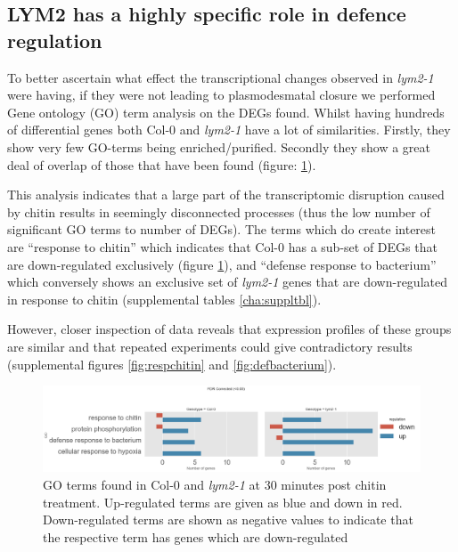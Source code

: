 \documentclass[../main.tex]{subfiles}
\begin{document}
\subsection{LYM2 has a highly specific role in defence regulation}

To better ascertain what effect the transcriptional changes observed in
\textit{lym2-1} were having, if they were not leading to plasmodesmatal closure we
performed Gene ontology (GO) term analysis on the DEGs found. Whilst having
hundreds of differential genes both Col-0 and \textit{lym2-1} have a lot of
similarities. Firstly, they show very few GO-terms being enriched/purified.
Secondly they show a great deal of overlap of those that have been found
(figure: \ref{fig:05hrGO}).

This analysis indicates that a large part of the transcriptomic disruption
caused by chitin results in seemingly disconnected processes (thus the low
number of significant GO terms to number of DEGs). The terms which do create interest are
``response to chitin'' which indicates that Col-0 has a sub-set of DEGs that are
down-regulated exclusively (figure \ref{fig:05hrGO}), and ``defense response to bacterium''
which conversely shows an exclusive set of \textit{lym2-1} genes that are
down-regulated in response to chitin (supplemental
tables \ref{cha:suppltbl}).

However, closer inspection of data reveals that expression profiles of these groups
are similar and that repeated experiments could give contradictory results
(supplemental figures \ref{fig:respchitin} and \ref{fig:defbacterium}).


\begin{figure}[ht]
  \centering
  \includegraphics[width=\columnwidth]{figures/05hrGO.png}
  \caption[GO terms found in Col-0 and \textit{lym2-1} at 30
    minutes post chitin treatment]{\label{fig:05hrGO} GO terms found in Col-0 and \textit{lym2-1} at 30
    minutes post chitin treatment. Up-regulated terms are given as blue and down
  in red. Down-regulated terms are shown as negative values to indicate that the
  respective term has genes which are down-regulated}
\end{figure}
\end{document}
